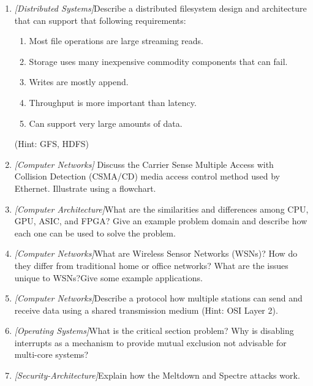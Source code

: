 \documentclass{article}
\begin{document}
\begin{enumerate}
	\item{\textit{[Distributed Systems]}Describe a distributed filesystem design and architecture that can support that following requirements:

		\begin{enumerate}
			\item{Most file operations are large streaming reads.}
			\item{Storage uses many inexpensive commodity components that can fail.}
			\item{Writes are mostly append.} 
			\item{Throughput is more important than latency.}
			\item{Can support very large amounts of data.}
		\end{enumerate}
		(Hint: GFS, HDFS)}
		
	\item{\textit{[Computer Networks]} Discuss the Carrier Sense Multiple Access with Collision Detection (CSMA/CD) media access control method used by Ethernet. Illustrate using a flowchart.
		}  	
  	
	\item{\textit{[Computer Architecture]}What are the similarities and differences among CPU, GPU, ASIC, and FPGA? Give an example problem domain and describe how each one can be used to solve the problem.}  	
  	
	\item{\textit{[Computer Networks]}What are Wireless Sensor Networks (WSNs)? How do they differ from traditional home or office networks? What are the issues unique to WSNs?Give some example applications.}  	
	
   \item{\textit{[Computer Networks]}Describe a protocol how multiple stations can send and receive data using a shared transmission medium (Hint: OSI Layer 2).}  	
	
   \item{\textit{[Operating Systems]}What is the critical section problem? Why is disabling interrupts as a mechanism to provide mutual exclusion not advisable for multi-core systems?}  	
	
   \item{\textit{[Security-Architecture]}Explain how the Meltdown and Spectre attacks work.}  	
  	
\end{enumerate}

\begin{thebibliography}{9}

\end{thebibliography}
\end{document}
